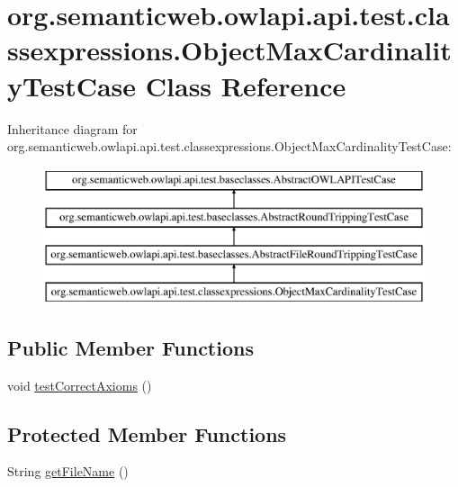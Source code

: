 \hypertarget{classorg_1_1semanticweb_1_1owlapi_1_1api_1_1test_1_1classexpressions_1_1_object_max_cardinality_test_case}{\section{org.\-semanticweb.\-owlapi.\-api.\-test.\-classexpressions.\-Object\-Max\-Cardinality\-Test\-Case Class Reference}
\label{classorg_1_1semanticweb_1_1owlapi_1_1api_1_1test_1_1classexpressions_1_1_object_max_cardinality_test_case}
}
Inheritance diagram for org.\-semanticweb.\-owlapi.\-api.\-test.\-classexpressions.\-Object\-Max\-Cardinality\-Test\-Case\-:\begin{figure}[H]
\begin{center}
\leavevmode
\includegraphics[height=4.000000cm]{classorg_1_1semanticweb_1_1owlapi_1_1api_1_1test_1_1classexpressions_1_1_object_max_cardinality_test_case}
\end{center}
\end{figure}
\subsection*{Public Member Functions}
\begin{DoxyCompactItemize}
\item 
void \hyperlink{classorg_1_1semanticweb_1_1owlapi_1_1api_1_1test_1_1classexpressions_1_1_object_max_cardinality_test_case_a8054b6b5deee8f911d041b26ada955e4}{test\-Correct\-Axioms} ()
\end{DoxyCompactItemize}
\subsection*{Protected Member Functions}
\begin{DoxyCompactItemize}
\item 
String \hyperlink{classorg_1_1semanticweb_1_1owlapi_1_1api_1_1test_1_1classexpressions_1_1_object_max_cardinality_test_case_aba25b652a4f547d3f5b5a076fc32395b}{get\-File\-Name} ()
\end{DoxyCompactItemize}


